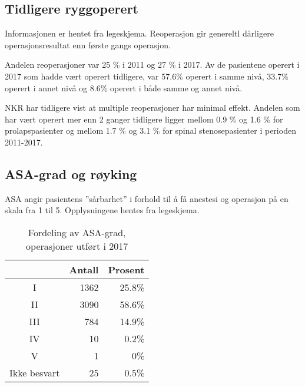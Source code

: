 \documentclass [norsk,a4paper,twoside]{article}\usepackage[]{graphicx}\usepackage[]{color}
\begin{document}
\clearpage

\subsection{Tidligere ryggoperert}
Informasjonen er hentet fra legeskjema.
Reoperasjon gir genereltl dårligere operasjonsresultat enn første gangs operasjon.





Andelen reoperasjoner var 25 \% i 2011 og 27 \% i 2017.
Av de pasientene operert i 2017 som hadde vært operert tidligere, var 57.6\% 
operert i samme nivå, 33.7\% 
operert i annet nivå og 8.6\% 
operert i både samme og annet nivå.




NKR har tidligere vist at multiple reoperasjoner har minimal effekt. Andelen som har vært operert 
mer enn 2 ganger tidligere ligger mellom 0.9 \%
og 1.6 \% for prolapspasienter og mellom 1.7 \%
og 3.1 \% for spinal stenosepasienter i perioden 2011-2017. 



\subsection{ASA-grad og røyking}
ASA angir pasientens ”sårbarhet” i forhold til å få anestesi og operasjon på en skala fra 1 til 5. 
Opplysningene hentes fra legeskjema.
\begin{table}[ht]
\centering
\begin{tabular}{crr}
  \hline
 & Antall & Prosent \\ 
  \hline
I & 1362 & 25.8\% \\ 
  II & 3090 & 58.6\% \\ 
  III & 784 & 14.9\% \\ 
  IV & 10 & 0.2\% \\ 
  V & 1 & 0\% \\ 
  Ikke besvart & 25 & 0.5\% \\ 
   \hline
\end{tabular}
\caption{Fordeling av ASA-grad, operasjoner utført i 2017} 
\label{tab:ASA}
\end{table}
\end{document}
